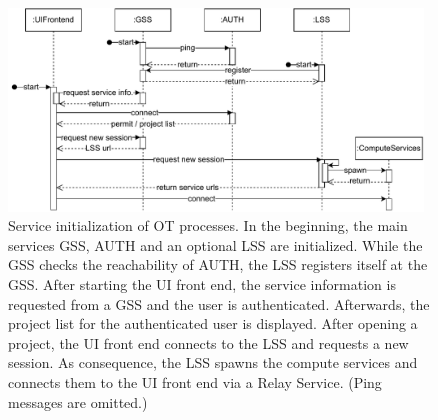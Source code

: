 \begin{figure}[h]
	\centering
	\includegraphics[width=0.98\textwidth]{Figures/opentwin-network-communication-sequence.pdf}
	\caption{Service initialization of \ac{OT} processes. In the beginning, the main services \ac{GSS}, \ac{AUTH} and an optional \ac{LSS} are initialized. While the \ac{GSS} checks the reachability of \ac{AUTH}, the \ac{LSS} registers itself at the \ac{GSS}. After starting the \ac{UI} front end, the service information is requested from a \ac{GSS} and the user is authenticated. Afterwards, the project list for the authenticated user is displayed. After opening a project, the \ac{UI} front end connects to the \ac{LSS} and requests a new session. As consequence, the \ac{LSS} spawns the compute services and connects them to the \ac{UI} front end via a Relay Service. (Ping messages are omitted.)}
	\label{fig:ot-network-communication-sequence}
\end{figure}






